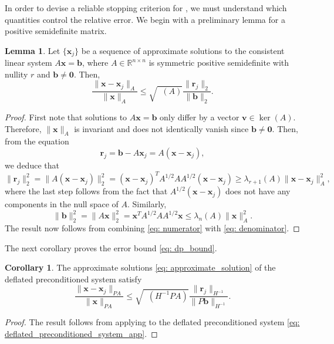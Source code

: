 \documentclass{article}
\numberwithin{equation}{section}
\DeclareMathOperator{\keff}{\kappa_{\operatorname{eff}}}
\theoremstyle{definition}
\newtheorem{lemma}[definition]{Lemma}
\newtheorem{corollary}[definition]{Corollary}
\begin{document}
\begin{appendices}
In order to devise a reliable stopping criterion for , we must understand which quantities control the relative error. We begin with a preliminary lemma for a positive semidefinite matrix.

\begin{lemma}
\label{lem: error_bound_spsd}
Let $\{\bm{x}_j\}$ be a sequence of approximate solutions to the consistent linear system $A\bm{x}=\bm{b}$, where $A \in \mathbb{R}^{n \times n}$ is symmetric positive semidefinite with nullity $r$ and $\bm{b} \neq \bm{0}$. Then,
\begin{equation*}
    \frac{\|\bm{x}-\bm{x}_j\|_A}{\|\bm{x}\|_A} \leq \sqrt{\keff(A)} \frac{\|\bm{r}_j\|_2}{\|\bm{b}\|_2}.
\end{equation*}
\end{lemma}
\begin{proof}
First note that solutions to $A\bm{x}=\bm{b}$ only differ by a vector $\bm{v} \in \ker(A)$. Therefore, $\|\bm{x}\|_A$ is invariant and does not identically vanish since $\bm{b} \neq \bm{0}$.
Then, from the equation
\begin{equation*}
    \bm{r}_j = \bm{b} - A\bm{x}_j = A(\bm{x}-\bm{x}_j),
\end{equation*}
we deduce that
\begin{equation}
    \|\bm{r}_j\|_2^2 = \|A(\bm{x}-\bm{x}_j)\|_2^2 =(\bm{x}-\bm{x}_j)^TA^{1/2}AA^{1/2}(\bm{x}-\bm{x}_j) \geq \lambda_{r+1}(A)\|\bm{x}-\bm{x}_j\|_A^2, \label{eq: numerator}
\end{equation}
where the last step follows from the fact that $A^{1/2}(\bm{x}-\bm{x}_j)$ does not have any components in the null space of $A$. Similarly,
\begin{equation}
\label{eq: denominator}
    \|\bm{b}\|_2^2 = \|A\bm{x}\|_2^2 = \bm{x}^TA^{1/2}AA^{1/2}\bm{x} \leq \lambda_n(A)\|\bm{x}\|_A^2.
\end{equation}
The result now follows from combining \eqref{eq: numerator} with \eqref{eq: denominator}.
\end{proof}
The next corollary proves the error bound \eqref{eq: dp_bound}.

\begin{corollary}
The approximate solutions \eqref{eq: approximate_solution} of the deflated preconditioned system satisfy
\begin{equation*}
    \frac{\|\bm{x}-\bm{x}_j\|_{PA}}{\|\bm{x}\|_{PA}} \leq \sqrt{\keff(H^{-1}PA)} \frac{\|\bm{r}_j\|_{H^{-1}}}{\|P\bm{b}\|_{H^{-1}}}.
\end{equation*}
\end{corollary}
\begin{proof}
The result follows from applying  to the deflated preconditioned system \eqref{eq: deflated_preconditioned_system_app}.
\end{proof}
\end{appendices}
\end{document}
